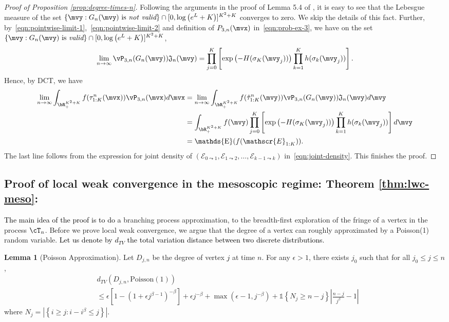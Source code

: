 \documentclass[letterpaper,11pt,reqno]{amsart}
\theoremstyle{definition}
\renewcommand{\leq}{\leqslant}
\renewcommand{\geq}{\geqslant}
\newcommand{\ind}{\mathds{1}}
\newcommand{\abs}[1]{\left\vert#1\right\vert}
\newcommand{\set}[1]{\left\{#1\right\}}
\newcommand{\fJ}{\mathfrak{J}}\newcommand{\fK}{\mathfrak{K}}\newcommand{\fL}{\mathfrak{L}}
\newcommand{\sE}{\mathscr{E}}
\DeclareMathOperator{\E}{\mathds{E}}
\newtheorem{lemma}[thm]{Lemma}
\begin{document}
\begin{proof}[Proof of Proposition \ref{prop:degree-times-n}]
    Following the arguments in the proof of Lemma 5.4 of \cite{BBDS04_macro}, it is easy to see that the Lebesgue measure of the set $\set{\mvy : G_n(\mvy) \text{ is \emph{not} } \emph{valid}} \cap [0, \log\left(e^L + K\right)]^{K^2+K}$ converges to zero. We skip the details of this fact. 
    Further, by~\eqref{eqn:pointwise-limit-1},~\eqref{eqn:pointwise-limit-2} and definition of $P_{3,n}(\mvx)$ in~\eqref{eqn:prob-ex-3}, we have on the set $\set{\mvy : G_n(\mvy) \text{ is } \emph{valid}} \cap [0, \log\left(e^L + K\right)]^{K^2+K}$, 
\begin{align*}
 \lim\limits_{n\to \infty}\vP_{3,n}(G_n(\mvy)) \fJ_n(\mvy) =  \prod_{j=0}^K \left[ \exp\left(-H(\sigma_K(\mvy_j))\right)\prod_{k=1}^K h(\sigma_k(\mvy_j))\right].
\end{align*} Hence, by DCT, we have \begin{align*}
    \lim\limits_{n\to \infty}\int_{\bR_+^{K^2+K}} f(\tau^n_{1:K}(\mvx)) \vP_{3,n}(\mvx)d\mvx &=    \lim\limits_{n\to \infty}\int_{\bR_+^{K^2+K}} f(\hat{\tau}^n_{1:K}(\mvy)) \vP_{3,n}(G_n(\mvy)) \fJ_n(\mvy) d\mvy\\
    &=\int_{\bR_+^{K^2+K}} f(\mvy) \prod_{j=0}^K \left[ \exp\left(-H(\sigma_K(\mvy_j))\right)\prod_{k=1}^K h(\sigma_k(\mvy_j))\right] d\mvy\\
    &=\E(f(\sE_{1:K})).
\end{align*} The last line follows from the expression for joint density of $(\sE_{0\leadsto 1},\sE_{1\leadsto 2},\dots,\sE_{k-1\leadsto k})$ in~\eqref{eqn:joint-density}.  This finishes the proof.\end{proof}


\subsection{Proof of local weak convergence in the mesoscopic regime: Theorem \ref{thm:lwc-meso}:}  
\textcolor{black}{The main idea of the proof is to do a} branching process approximation, to the breadth-first exploration of the fringe of a vertex in the process $\cT_n$. Before we prove local weak convergence, we argue that the degree of a vertex can roughly approximated by a Poisson(1) random variable. \textcolor{black}{Let us denote by $d_{TV}$ the total variation distance between two discrete distributions.}
\begin{lemma}[Poisson Approximation]\label{lem:poiss-approx} Let $D_{j,n}$ be the degree of vertex \textcolor{black}{$j$} at time $n$.
    For any $\epsilon > 1$, there exists $j_0$ such that for all $j_0 \leq j \leq n$,  \begin{align*}
        &d_{TV}\left(D_{j,n}, \text{Poisson}(1)\right) \\
        &\leq \epsilon \left[1-(1+\epsilon j^{\beta-1})^{-\beta}\right] + \epsilon j^{-\beta} + \max(\epsilon-1,j^{-\beta})+ \ind\set{N_j\geq n-j} \abs{\frac{n-j}{j^\beta}-1}
    \end{align*}where $N_j = \abs{\set{i\geq j:i-i^\beta \leq j}}.$
\end{lemma}
\end{document}
